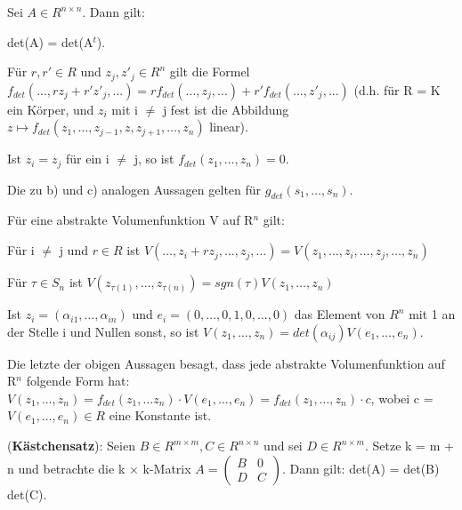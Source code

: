 \begin{lemma}
Sei $A \in R^{n \times n}$. Dann gilt:
\begin{compactenum}
\item det(A) = det(A$^t$).
\item Für $r, r' \in R$ und $z_j,z'_j \in R^n$ gilt die Formel $f_{det}(...,rz_j + r'z'_j,...) = r f_{det}(...,z_j,...) + r' f_{det}(...,z'_j,...)$ (d.h. für R = K ein Körper, und $z_i$ mit i $\neq$ j fest ist die Abbildung $z \mapsto f_{det}(z_1,… , z_{j-1}, z, z_{j+1},… , z_n)$ linear). 
\item Ist $z_i = z_j$ für ein i $\neq$ j, so ist $f_{det}(z_1, ..., z_n) = 0$.
\item Die zu b) und c) analogen Aussagen gelten für $g_{det}(s_1, …, s_n)$.
\end{compactenum}
\end{lemma}

\begin{proposition}
Für eine abstrakte Volumenfunktion V auf R$^n$ gilt:
\begin{compactenum}
\item Für i $\neq$ j und $r \in R$ ist $V(…, z_i + rz_j, …, z_j, …) = V(z_1, …, z_i, …, z_j, …, z_n)$
\item Für $\tau \in S_n$ ist $V(z_{\tau(1)}, …, z_{\tau(n)}) = sgn(\tau)V(z_1, …, z_n)$
\item Ist $z_i = (\alpha_{i1}, …, \alpha_{in})$ und $e_i = (0, …, 0, 1, 0, …, 0)$ das Element von $R^n$ mit 1 an der Stelle i und Nullen sonst, so ist $V(z_1, …, z_n) = det(\alpha_{ij}) V(e_1, …, e_n)$.
\end{compactenum}
\end{proposition}

\begin{remark}
Die letzte der obigen Aussagen besagt, dass jede abstrakte Volumenfunktion auf R$^n$ folgende Form hat:
$V (z_1, …, z_n) = f_{det}(z_1, … z_n) \cdot V (e_1, …, e_n) = f_{det}(z_1, …, z_n) \cdot c$, wobei c = $V (e_1,…, e_n) \in R$ eine Konstante ist.
\end{remark}

\begin{lemma}
(\textbf{Kästchensatz}): Seien $B \in R^{m \times m},C \in R^{n \times n}$ und sei $D \in R^{n \times m}$. Setze k = m + n und betrachte die k $\times$ k-Matrix $A = \begin{pmatrix} B & 0 \\ D & C \end{pmatrix}$. Dann gilt: det(A) = det(B) det(C).
\end{lemma}

